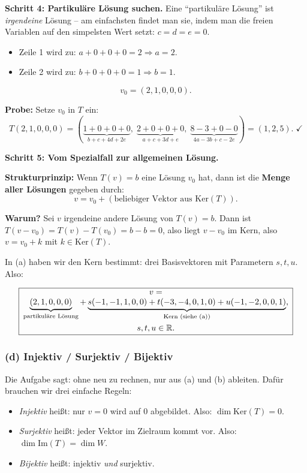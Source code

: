 \documentclass[a4paper,12pt]{article}
\begin{document}
\textbf{Schritt 4: Partikul\"are L\"osung suchen.} Eine ``partikul\"are L\"osung'' ist \emph{irgendeine} L\"osung -- am einfachsten findet man sie, indem man die freien Variablen auf den simpelsten Wert setzt: $c = d = e = 0$.

\begin{itemize}[leftmargin=*, nosep]
    \item Zeile 1 wird zu: $a + 0 + 0 + 0 = 2 \Rightarrow a = 2$.
    \item Zeile 2 wird zu: $b + 0 + 0 + 0 = 1 \Rightarrow b = 1$.
\end{itemize}
\[
v_0 = (2, 1, 0, 0, 0).
\]

\textbf{Probe:} Setze $v_0$ in $T$ ein:
\[
T(2, 1, 0, 0, 0) = (\underbrace{1 + 0 + 0 + 0}_{b+c+4d+2e},\; \underbrace{2 + 0 + 0 + 0}_{a+c+3d+e},\; \underbrace{8 - 3 + 0 - 0}_{4a-3b+c-2e}) = (1, 2, 5). \;\checkmark
\]

\textbf{Schritt 5: Vom Spezialfall zur allgemeinen L\"osung.}

\textbf{Strukturprinzip:} Wenn $T(v) = b$ eine L\"osung $v_0$ hat, dann ist die \textbf{Menge aller L\"osungen} gegeben durch:
\[
v = v_0 + (\text{beliebiger Vektor aus } \text{Ker}(T)).
\]

\textbf{Warum?} Sei $v$ irgendeine andere L\"osung von $T(v) = b$. Dann ist $T(v - v_0) = T(v) - T(v_0) = b - b = 0$, also liegt $v - v_0$ im Kern, also $v = v_0 + k$ mit $k \in \text{Ker}(T)$.

In (a) haben wir den Kern bestimmt: drei Basisvektoren mit Parametern $s, t, u$. Also:

\[
\fbox{\parbox{0.93\textwidth}{\centering
$v = \underbrace{(2, 1, 0, 0, 0)}_{\text{partikul\"are L\"osung}}
+ \underbrace{s(-1,-1,1,0,0) + t(-3,-4,0,1,0) + u(-1,-2,0,0,1)}_{\text{Kern (siehe (a))}}$, \\[4pt]
$s, t, u \in \mathbb{R}.$
}}
\]

\subsubsection*{(d) Injektiv / Surjektiv / Bijektiv}

Die Aufgabe sagt: ohne neu zu rechnen, nur aus (a) und (b) ableiten. Daf\"ur brauchen wir drei einfache Regeln:

\begin{itemize}[leftmargin=*, nosep]
    \item \emph{Injektiv} hei\ss t: nur $v = 0$ wird auf $0$ abgebildet. Also: $\dim \text{Ker}(T) = 0$.
    \item \emph{Surjektiv} hei\ss t: jeder Vektor im Zielraum kommt vor. Also: $\dim \text{Im}(T) = \dim W$.
    \item \emph{Bijektiv} hei\ss t: injektiv \emph{und} surjektiv.
\end{itemize}
\end{document}
